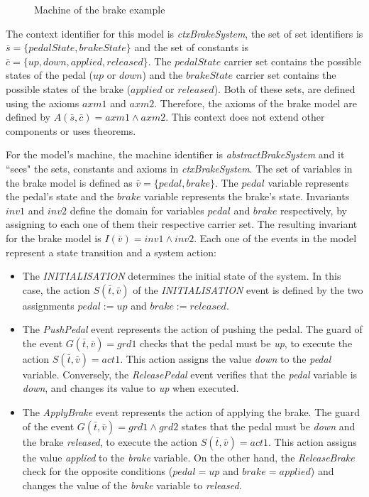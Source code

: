 \begin{example}
\begin{figure}[H]
    \caption{Machine of the brake example}
    \label{fig:brake2}
\end{figure}
The context identifier for this model is \textit{ctxBrakeSystem}, the set of set identifiers is $\bar{s} = \{pedalState, brakeState\}$ and the set of constants is $\bar{c} = \{up, down, applied, released \}$. The $pedalState$ carrier set contains the possible states of the pedal ($up$ or $down$) and the $brakeState$ carrier set contains the possible states of the brake ($applied$ or $released$). Both of these sets, are defined using the axioms $axm1$ and $axm2$. Therefore, the axioms of the brake model are defined by $A(\bar{s},\bar{c}) = axm1 \land axm2$. This context does not extend other components or uses theorems. 

For the model's machine, the machine identifier is \textit{abstractBrakeSystem} and it ``sees" the sets, constants and axioms in \textit{ctxBrakeSystem}. The set of variables in the brake model is defined as $\bar{v} = \{pedal, brake\}$. The $pedal$ variable represents the pedal's state and the $brake$ variable represents the brake's state. Invariants $inv1$ and $inv2$ define the domain for variables $pedal$ and $brake$ respectively, by assigning to each one of them their respective carrier set. The resulting invariant for the brake model is $I(\bar{v}) = inv1 \land inv2$. Each one of the events in the model represent a state transition and a system action:
\begin{itemize}
    \item The \textit{INITIALISATION} determines the initial state of the system. In this case, the action $S(\bar{t}, \bar{v})$ of the \textit{INITIALISATION} event is defined by the two assignments $pedal := up$ and $brake := released$.
     
    \item The \textit{PushPedal} event represents the action of pushing the pedal. The guard of the event $G(\bar{t}, \bar{v}) = grd1$ checks that the pedal must be \textit{up}, to execute the action $S(\bar{t}, \bar{v}) = act1$. This action assigns the value \textit{down} to the \textit{pedal} variable. Conversely, the \textit{ReleasePedal} event verifies that the \textit{pedal} variable is \textit{down}, and changes its value to \textit{up} when executed.
    
    \item The \textit{ApplyBrake} event represents the action of applying the brake. The guard of the event $G(\bar{t}, \bar{v}) = grd1 \land grd2$ states that the pedal must be \textit{down} and the brake \textit{released}, to execute the action $S(\bar{t}, \bar{v}) = act1$. This action assigns the value \textit{applied} to the \textit{brake} variable. On the other hand, the \textit{ReleaseBrake} check for the opposite conditions ($pedal = up$ and $brake = applied$) and changes the value of the \textit{brake} variable to \textit{released}. 
\end{itemize}
\end{example}



